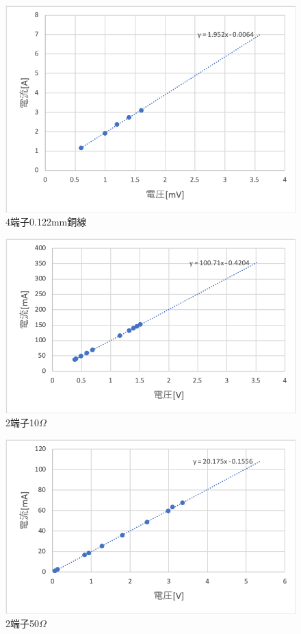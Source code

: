 \documentclass[11pt, a4paper,twocolumn]{jarticle}
\begin{document}
\begin{figure}[htbp]
 \begin{center}
  \includegraphics[width=0.8\linewidth]{fig7.png}
 \end{center}
 \caption{4端子0.122mm銅線}
 \label{fig:7}
\end{figure}

\begin{figure}[htbp]
 \begin{center}
  \includegraphics[width=0.8\linewidth]{fig9.png}
 \end{center}
 \caption{2端子10$\Omega$}
 \label{fig:9}
\end{figure}

\begin{figure}[htbp]
 \begin{center}
  \includegraphics[width=0.8\linewidth]{fig8.png}
 \end{center}
 \caption{2端子50$\Omega$}
 \label{fig:8}
\end{figure}
\end{document}

